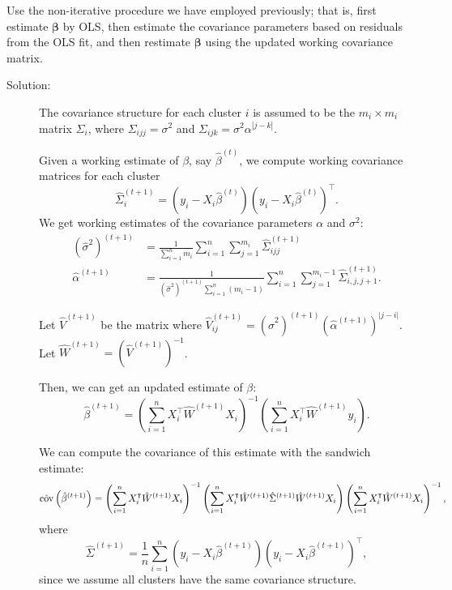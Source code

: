 \documentclass[11pt, letterpaper]{article}
\newcommand{\bbeta}{{\bm \beta}}
\begin{document}
\begin{enumerate}[(a)]
{\em \item Use the non-iterative procedure we have employed previously; that is, first estimate $\bbeta$ by OLS, then estimate the covariance parameters based on residuals from the OLS fit, and then restimate $\bbeta$ 
  using the updated working covariance matrix. }

\begin{description}
\item[Solution:] The covariance structure for each cluster $i$ is assumed to be
  the $m_i \times m_i$ matrix $\Sigma_i$, where $\Sigma_{ijj} = \sigma^2$ and
  $\Sigma_{ijk} = \sigma^2\alpha^{\left\lvert j - k\right\rvert}$.

  Given a working estimate of $\beta$, say $\hat{\beta}^{(t)}$, we compute
  working covariance matrices for each cluster
  \[\hat{\Sigma}_i^{(t + 1)} = \left(y_i - X_i\hat{\beta}^{(t)}\right)\left(y_i -
      X_i\hat{\beta}^{(t)}\right)^\intercal.\] We get working estimates of the
  covariance parameters $\alpha$ and $\sigma^2$:
  \begin{align*}
    \left(\hat{\sigma}^2\right)^{(t + 1)}
    &= \frac{1}{\sum_{i=1}^nm_i}\sum_{i=1}^n\sum_{j=1}^{m_i}\hat{\Sigma}_{ijj}^{(t + 1)} \\
    \hat{\alpha}^{(t + 1)}
    &= \frac{1}{\left(\hat{\sigma}^2\right)^{(t + 1)}\sum_{i=1}^n\left(m_i - 1\right)}
      \sum_{i=1}^n\sum_{j=1}^{m_i-1}\hat{\Sigma}_{i,j,j+1}^{(t + 1)}.
  \end{align*}


  Let $\hat{V}^{(t+1)}$ be the matrix where
  $\hat{V}_{ij}^{(t+1)} = \left(\hat{\sigma}^2\right)^{(t+1)}
  \left(\hat{\alpha}^{(t+1)}\right)^{\lvert j - i\rvert}$. Let
  $\hat{W}^{(t+1)} = \left(\hat{V}^{(t+1)}\right)^{-1}$.

  Then, we
  can get an updated estimate of $\beta$:
  \begin{equation}
    \hat{\beta}^{(t+1)} =
    \left(
      \sum_{i=1}^n X_i^\intercal \hat{W}^{(t+1)} X_i
    \right)^{-1}
    \left(
      \sum_{i=1}^n X_i^\intercal \hat{W}^{(t+1)} y_i
    \right).
  \end{equation}

  We can compute the covariance of this estimate with the sandwich estimate:
  \begin{equation}
    \small
    \hat{\operatorname{cov}}\left(
      \hat{\beta}^{(t+1)}
    \right) =
    \left(
      \sum_{i=1}^n X_i^\intercal \hat{W}^{(t+1)} X_i
    \right)^{-1}
    \left(
      \sum_{i=1}^n X_i^\intercal \hat{W}^{(t+1)} 
      \hat{\Sigma}^{(t+1)}
      \hat{W}^{(t+1)} 
      X_i
    \right)
    \left(
      \sum_{i=1}^n X_i^\intercal \hat{W}^{(t+1)} X_i
    \right)^{-1},
    \label{eqn:sandwich_estimate}
  \end{equation}
  where \[
    \hat{\Sigma}^{(t+1)} = \frac{1}{n}\sum_{i=1}^n
    \left(y_i - X_i\hat{\beta}^{(t+1)}\right)
    \left(y_i - X_i\hat{\beta}^{(t+1)}\right)^\intercal,
  \]
  since we assume all clusters have the same covariance structure.


\end{description}
\end{enumerate}
\end{document}

